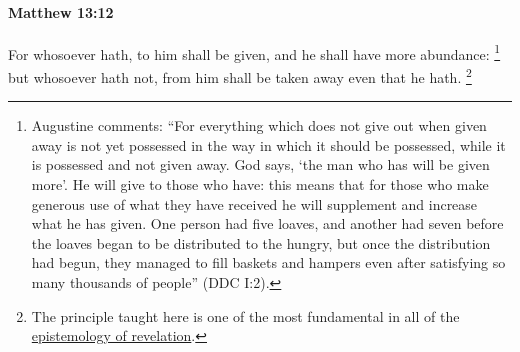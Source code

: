 			\begin{framed}
			\scriptsize
				\begin{compactdesc}
					\item[SBLG]  \hyperref[MUSTERION]{} 
				\end{compactdesc}
			\end{framed}

		\paragraph{Matthew 13:12} %
			\label{MATTHEW-13-12}

			For whosoever hath, to him shall be given, and he shall have more abundance:%
				\footnote{%
					Augustine comments: ``For everything which does not give out when given away is not yet possessed in the way in which it should be possessed, while it is possessed and not given away. God says, `the man who has will be given more'. He will give to those who have: this means that for those who make generous use of what they have received he will supplement and increase what he has given. One person had five loaves, and another had seven before the loaves began to be distributed to the hungry, but once the distribution had begun, they managed to fill baskets and hampers even after satisfying so many thousands of people'' (DDC I:2).
					}
			but whosoever hath not, from him shall be taken away even that he hath.%
				\footnote{%
					The principle taught here is one of the most fundamental in all of the \hyperref[EPIST-REVELATION]{epistemology of revelation}.
					}

